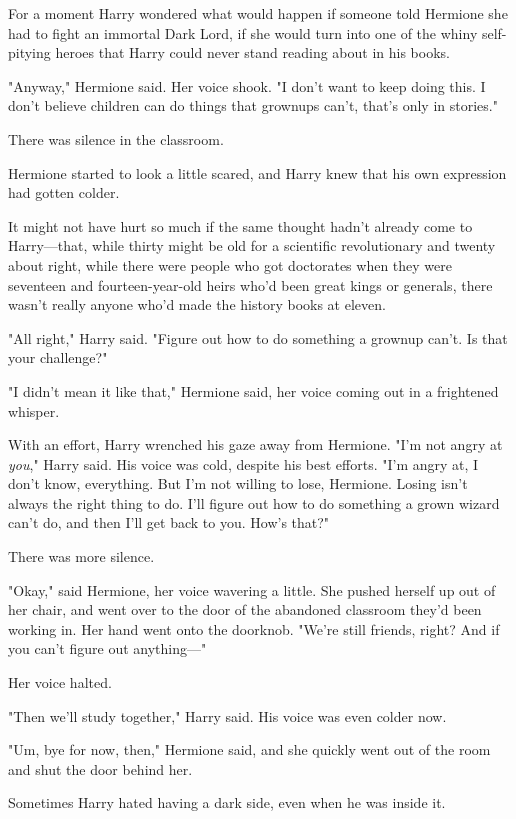For a moment Harry wondered what would happen if someone told Hermione she had 
to fight an immortal Dark Lord, if she would turn into one of the whiny 
self-pitying heroes that Harry could never stand reading about in his books.

"Anyway," Hermione said. Her voice shook. "I don't want to keep doing this. I 
don't believe children can do things that grownups can't, that's only in 
stories."

There was silence in the classroom.

Hermione started to look a little scared, and Harry knew that his own 
expression had gotten colder.

It might not have hurt so much if the same thought hadn't already come to 
Harry---that, while thirty might be old for a scientific revolutionary and 
twenty about right, while there were people who got doctorates when they were 
seventeen and fourteen-year-old heirs who'd been great kings or generals, there 
wasn't really anyone who'd made the history books at eleven.

"All right," Harry said. "Figure out how to do something a grownup can't. Is 
that your challenge?"

"I didn't mean it like that," Hermione said, her voice coming out in a 
frightened whisper.

With an effort, Harry wrenched his gaze away from Hermione. "I'm not angry at 
\emph{you}," Harry said. His voice was cold, despite his best efforts. "I'm 
angry at, I don't know, everything. But I'm not willing to lose, Hermione. 
Losing isn't always the right thing to do. I'll figure out how to do something 
a grown wizard can't do, and then I'll get back to you. How's that?"

There was more silence.

"Okay," said Hermione, her voice wavering a little. She pushed herself up out 
of her chair, and went over to the door of the abandoned classroom they'd been 
working in. Her hand went onto the doorknob. "We're still friends, right? And 
if you can't figure out anything---"

Her voice halted.

"Then we'll study together," Harry said. His voice was even colder now.

"Um, bye for now, then," Hermione said, and she quickly went out of the room 
and shut the door behind her.

Sometimes Harry hated having a dark side, even when he was inside it.

